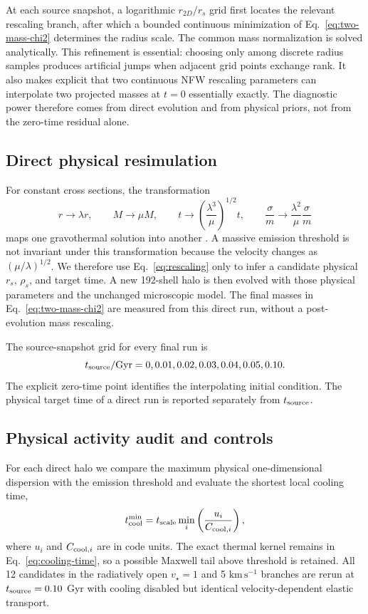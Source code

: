 \documentclass[12pt]{article}
\newcommand{\vstar}{v_\star}
\newcommand{\tcool}{t_{\rm cool}}
\begin{document}
At each source snapshot, a logarithmic $r_{2D}/r_s$ grid first locates the
relevant rescaling branch, after which a bounded continuous minimization of
Eq.~\eqref{eq:two-mass-chi2} determines the radius scale.  The common mass
normalization is solved analytically.  This refinement is essential: choosing
only among discrete radius samples produces artificial jumps when adjacent
grid points exchange rank.  It also makes explicit that two continuous NFW
rescaling parameters can interpolate two projected masses at $t=0$ essentially
exactly.  The diagnostic power therefore comes from direct evolution and from
physical priors, not from the zero-time residual alone.

\subsection{Direct physical resimulation}

For constant cross sections, the transformation
\begin{equation}
 r\rightarrow\lambda r,\qquad M\rightarrow\mu M,\qquad
 t\rightarrow\left(\frac{\lambda^3}{\mu}\right)^{1/2}t,
 \qquad \frac{\sigma}{m}\rightarrow\frac{\lambda^2}{\mu}\frac{\sigma}{m}
 \label{eq:rescaling}
\end{equation}
maps one gravothermal solution into another \citep{Schmidt2026}.  A massive
emission threshold is not invariant under this transformation because the
velocity changes as $(\mu/\lambda)^{1/2}$.  We therefore use
Eq.~\eqref{eq:rescaling} only to infer a candidate physical $r_s$, $\rho_s$,
and target time.  A new 192-shell halo is then evolved with those physical
parameters and the unchanged microscopic model.  The final masses in
Eq.~\eqref{eq:two-mass-chi2} are measured from this direct run, without a
post-evolution mass rescaling.

The source-snapshot grid for every final run is
\begin{equation}
  t_{\rm source}/{\rm Gyr}=0,0.01,0.02,0.03,0.04,0.05,0.10.
  \label{eq:time-grid}
\end{equation}
The explicit zero-time point identifies the interpolating initial condition.
The physical target time of a direct run is reported separately from
$t_{\rm source}$.

\subsection{Physical activity audit and controls}

For each direct halo we compare the maximum physical one-dimensional
dispersion with the emission threshold and evaluate the shortest local
cooling time,
\begin{equation}
  \tcool^{\rm min}=t_{\rm scale}
  \min_i\left(\frac{u_i}{C_{{\rm cool},i}}\right),
  \label{eq:cooling-time}
\end{equation}
where $u_i$ and $C_{{\rm cool},i}$ are in code units.  The exact thermal
kernel remains in Eq.~\eqref{eq:cooling-time}, so a possible Maxwell tail
above threshold is retained.  All 12 candidates in the radiatively open
$\vstar=1$ and 5 $\mathrm{km\,s^{-1}}$ branches are rerun at
$t_{\rm source}=0.10$ Gyr with cooling disabled but identical
velocity-dependent elastic transport.
\end{document}

